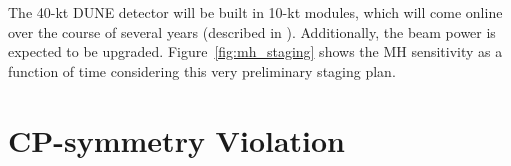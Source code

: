 
The 40-kt DUNE detector will be built in 10-kt modules, which will come online over the course of several years (described in \voldune).  Additionally, the beam power is expected to be upgraded. Figure~\ref{fig:mh_staging} shows the MH sensitivity as a function of time considering this very preliminary staging plan. 



\section{CP-symmetry Violation}
\label{sec:physics-lbnosc-cpv}

